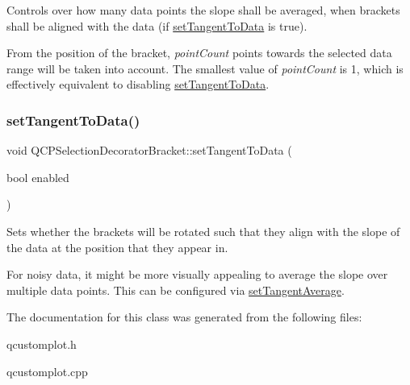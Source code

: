 Controls over how many data points the slope shall be averaged, when brackets shall be aligned with the data (if \hyperlink{class_q_c_p_selection_decorator_bracket_a93bc6086e53a5e40a08641a7b2e2cdd5}{set\+Tangent\+To\+Data} is true).

From the position of the bracket, {\itshape point\+Count} points towards the selected data range will be taken into account. The smallest value of {\itshape point\+Count} is 1, which is effectively equivalent to disabling \hyperlink{class_q_c_p_selection_decorator_bracket_a93bc6086e53a5e40a08641a7b2e2cdd5}{set\+Tangent\+To\+Data}. \mbox{\label{class_q_c_p_selection_decorator_bracket_a93bc6086e53a5e40a08641a7b2e2cdd5}} 
\subsubsection{\texorpdfstring{set\+Tangent\+To\+Data()}{setTangentToData()}}
{\footnotesize\ttfamily void Q\+C\+P\+Selection\+Decorator\+Bracket\+::set\+Tangent\+To\+Data (\begin{DoxyParamCaption}\item[{bool}]{enabled }\end{DoxyParamCaption})}

Sets whether the brackets will be rotated such that they align with the slope of the data at the position that they appear in.

For noisy data, it might be more visually appealing to average the slope over multiple data points. This can be configured via \hyperlink{class_q_c_p_selection_decorator_bracket_adb2d0876f25a77c88042b70818f1d6e4}{set\+Tangent\+Average}. 

The documentation for this class was generated from the following files\+:\begin{DoxyCompactItemize}
\item 
qcustomplot.\+h\item 
qcustomplot.\+cpp\end{DoxyCompactItemize}
